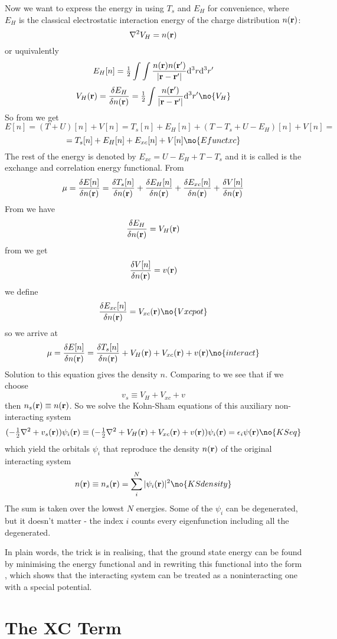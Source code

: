 Now we want to express the energy in  using $T_s$ and $E_H$ for
convenience, 
where $E_H$ is the classical electrostatic interaction energy of the charge
distribution $n({\bf r})$:
$$\nabla^2 V_H=n({\bf r})$$
or uquivalently
$$E_H[n]={\textstyle{1\over2}}\int\int {n({\bf r})n({\bf r'})\over|{\bf r}-{\bf r'}|}
{\rm d}^3r{\rm d}^3r'$$
$$V_H({\bf r})={\delta E_H\over\delta n({\bf r})}=\half\int 
{n({\bf r'})\over|{\bf r}-{\bf r'}|} \d^3r'\no{V_H}$$
So from  we get 
$$E[n]=(T+U)[n]+V[n]=T_s[n]+E_H[n]+(T-T_s+U-E_H)[n]+V[n]=$$
$$=T_s[n]+E_H[n]+E_{xc}[n]+V[n]\no{Efunctxc}$$
The rest of the energy is denoted by $E_{xc}=U-E_H+T-T_s$ and it is called is the
exchange and correlation energy functional.
From 
$$\mu={\delta E[n]\over\delta n({\bf r})}=
{\delta T_s[n]\over\delta n({\bf r})}+
{\delta E_H[n]\over\delta n({\bf r})}+
{\delta E_{xc}[n]\over\delta n({\bf r})}+
{\delta V[n]\over\delta n({\bf r})}
$$
From  we have
$${\delta E_H\over\delta n({\bf r})}=V_H({\bf r})$$
from  we get
$${\delta V[n]\over\delta n({\bf r})}=v({\bf r})$$
we define 
$${\delta E_{xc}[n]\over\delta n({\bf r})}=V_{xc}({\bf r})\no{Vxcpot}$$
so we arrive at
$$\mu={\delta E[n]\over\delta n({\bf r})}=
{\delta T_s[n]\over\delta n({\bf r})}+V_H({\bf r})+V_{xc}({\bf r})+v({\bf r})
\no{interact}
$$
Solution to this equation gives the density $n$.
Comparing  to  we see that if we choose
$$v_s\equiv V_H+V_{xc}+v$$
then $n_s({\bf r})\equiv n({\bf r})$.
So we solve the Kohn-Sham equations of this auxiliary non-interacting system
$$(-\half\nabla^2+v_s({\bf r}))\psi_i({\bf r})
\equiv(-\half\nabla^2+V_H({\bf r})+V_{xc}({\bf r})+v({\bf r}))\psi_i({\bf r})
=\epsilon_i\psi({\bf r})\no{KSeq}$$
which yield the orbitals $\psi_i$ that reproduce the density $n({\bf r})$ of
the original interacting system
$$n({\bf r})\equiv n_s({\bf r})=\sum_i^N|\psi_i({\bf r})|^2\no{KSdensity}$$
The sum is taken over the lowest $N$ energies. Some of the $\psi_i$ can be
degenerated, but it doesn't matter - the index $i$ counts every eigenfunction
including all the degenerated.

In plain words, the trick is in realising, that the ground state energy can be
found by minimising the energy functional  and in rewriting this
functional into the form , which shows that the interacting
system can be treated as a noninteracting one with a special potential.

\section{The XC Term}

